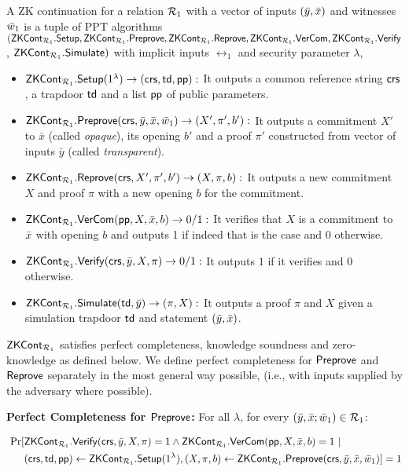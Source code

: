 \begin{definition}[ZK Continuation]
\label{def:zk_cont}
A ZK continuation for a relation $\mathcal{R}_1$ with a vector of 
inputs $(\bar{y}, \bar{x})$ and witnesses $\bar{w}_1$ is a tuple of PPT algorithms 
$({\mathsf{ZKCont}}_{\mathcal{R}_1}.{\mathsf{Setup}}, {\mathsf{ZKCont}}_{\mathcal{R}_1}.{\mathsf{Preprove}}, {\mathsf{ZKCont}}_{\mathcal{R}_1}.{\mathsf{Reprove}}, 
{\mathsf{ZKCont}}_{\mathcal{R}_1}.{\mathsf{VerCom}}, {\mathsf{ZKCont}}_{\mathcal{R}_1}.{\mathsf{Verify}} $, ${\mathsf{ZKCont}}_{\mathcal{R}_1}.{\mathsf{Simulate}})$
with  implicit inputs $ \rel_1  $ and security parameter $\lambda$,
\begin{itemize}

\item ${\mathsf{ZKCont}}_{\mathcal{R}_1}.{\mathsf{Setup}}(1^{\lambda}) \rightarrow (\mathsf{crs}, \mathsf{td}, \mathsf{pp}):$ It outputs a common reference 
string $\mathsf{crs}$, a trapdoor $\mathsf{td}$ and a list $\mathsf{pp}$ of public parameters.

\item ${\mathsf{ZKCont}}_{\mathcal{R}_1}.{\mathsf{Preprove}}(\mathsf{crs}, \bar{y}, \bar{x}, \bar{w}_1) \rightarrow (X', \pi', b'):$ It
outputs a commitment $X'$ to $\bar{x}$ (called \emph{opaque}), its opening $ b' $ and a proof $\pi'$ constructed from vector of inputs $\bar{y}$ (called \emph{transparent}).
\item ${\mathsf{ZKCont}}_{\mathcal{R}_1}.{\mathsf{Reprove}}(\mathsf{crs}, X', \pi', b') \rightarrow (X, \pi, b):$ It
outputs a new commitment $X$ and proof $\pi$ with a new opening $b$ for the commitment. 

\item ${\mathsf{ZKCont}}_{\mathcal{R}_1}.{\mathsf{VerCom}}(\mathsf{pp}, X, \bar{x}, b) \rightarrow 0/1:$
It verifies that  $X$ is a commitment to $\bar{x}$ with opening $b$ and 
outputs 1 if indeed that is the case and 0 otherwise.
 
\item ${\mathsf{ZKCont}}_{\mathcal{R}_1}.{\mathsf{Verify}}(\mathsf{crs}, \bar{y}, X, \pi) \rightarrow 0/1:$ It outputs $1$ if it verifies  and $0$ otherwise.

\item ${\mathsf{ZKCont}}_{\mathcal{R}_1}.{\mathsf{Simulate}}(\mathsf{td}, \bar{y})\rightarrow (\pi, X):$ It outputs a proof $\pi$ and $X$ given a simulation trapdoor $\mathsf{td}$ and statement $(\bar{y}, \bar{x})$. 

\end{itemize}
$ {\mathsf{ZKCont}}_{\mathcal{R}_1} $ satisfies perfect completeness, knowledge soundness and zero-knowledge as defined below.
We define perfect completeness for ${\mathsf{Preprove}}$ and ${\mathsf{Reprove}}$  separately  in the most general way possible,
(i.e., with inputs supplied by the adversary where possible).  

\noindent \textbf{Perfect Completeness for ${\mathsf{Preprove}}$:} For all $\lambda $, for every $(\bar{y}, \bar{x}; \bar{w}_1) \in \mathcal{R}_1$:
\begin{footnotesize}
\begin{align*}\
\Pr[&{\mathsf{ZKCont}}_{\mathcal{R}_1}.{\mathsf{Verify}}(\mathsf{crs}, \bar{y}, X, \pi) = 1 \wedge  {\ensuremath{\mathsf{ZKCont}}}_{\mathcal{R}_1}.{\mathsf{VerCom}} (\mathsf{pp}, X, \bar{x}, b) = 1\  | \ \\ 
&(\mathsf{crs}, \mathsf{td}, \mathsf{pp}) \leftarrow {\ensuremath{\mathsf{ZKCont}}}_{\mathcal{R}_1}.{\mathsf{Setup}} (1^{\lambda}), (X, \pi, b) \leftarrow {\ensuremath{\mathsf{ZKCont}}}_{\mathcal{R}_1}.{\mathsf{Preprove}}(\mathsf{crs}, \bar{y}, \bar{x}, \bar{w}_1)] = 1
\end{align*}
	

\end{footnotesize}
\end{definition}
